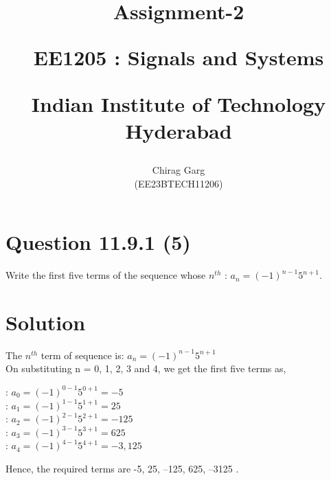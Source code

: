 \documentclass[journal,12pt,twocolumn]{IEEEtran}
\theoremstyle{remark}
\begin{document}
%




\vspace{3cm}

\title{
Assignment-2

\large{EE1205 : Signals and Systems}

Indian Institute of Technology Hyderabad
}
\author{Chirag Garg

(EE23BTECH11206)
}	





\maketitle

\newpage



\bigskip

\renewcommand{\thefigure}{\theenumi}
\renewcommand{\thetable}{\theenumi}


\section{Question 11.9.1 (5)}
\vspace{0.5cm}
\begin{flushleft}
 Write the first five terms of the sequence whose $n^{th}$  : $a_n = (-1)^{n-1}5^{n+1}$.
\end{flushleft} 


\vspace{0.8cm}


\section{Solution} 
\begin{flushleft}

\end{flushleft}
The $n^{th}$ term of sequence is: $a_n = (-1)^{n-1}5^{n+1}$\\
On substituting n = 0, 1, 2, 3 and 4, we get the first five terms as,
\begin{flushleft}

 : $a_0 = (-1)^{0-1}5^{0+1} =  -5 $\\
 : $a_1 = (-1)^{1-1}5^{1+1} = 25$ \\
 : $a_2 = (-1)^{2-1}5^{2+1} =  -125$ \\
 : $a_3 = (-1)^{3-1}5^{3+1} = 625$\\
 : $a_4 = (-1)^{4-1}5^{4+1} =  -3,125$\\ 
\end{flushleft}
Hence, the required terms are -5, 25, –125, 625, –3125 .
\end{document}
